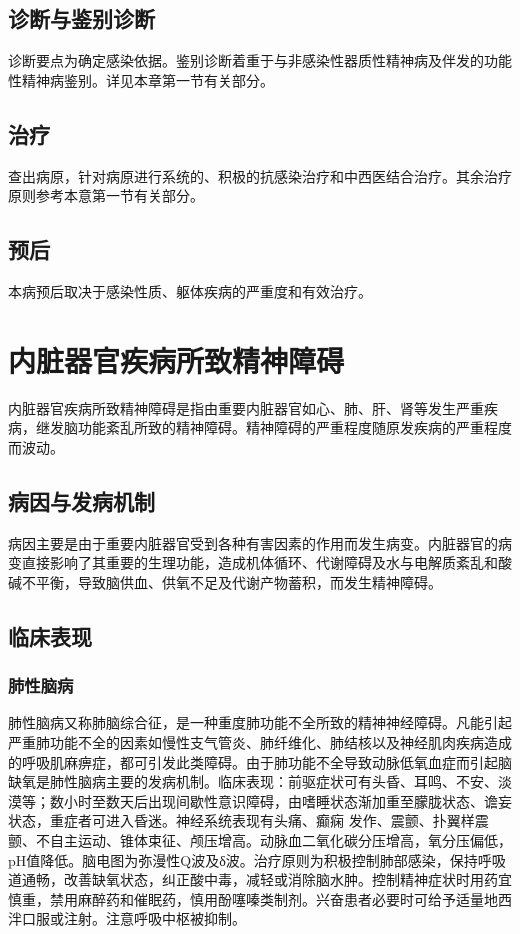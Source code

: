 \subsection{诊断与鉴别诊断}

诊断要点为确定感染依据。鉴别诊断着重于与非感染性器质性精神病及伴发的功能性精神病鉴别。详见本章第一节有关部分。

\subsection{治疗}

查出病原，针对病原进行系统的、积极的抗感染治疗和中西医结合治疗。其余治疗原则参考本意第一节有关部分。

\subsection{预后}

本病预后取决于感染性质、躯体疾病的严重度和有效治疗。

\section{内脏器官疾病所致精神障碍}

内脏器官疾病所致精神障碍是指由重要内脏器官如心、肺、肝、肾等发生严重疾病，继发脑功能紊乱所致的精神障碍。精神障碍的严重程度随原发疾病的严重程度而波动。

\subsection{病因与发病机制}

病因主要是由于重要内脏器官受到各种有害因素的作用而发生病变。内脏器官的病变直接影响了其重要的生理功能，造成机体循环、代谢障碍及水与电解质紊乱和酸碱不平衡，导致脑供血、供氧不足及代谢产物蓄积，而发生精神障碍。

\subsection{临床表现}

\subsubsection{肺性脑病}

肺性脑病又称肺脑综合征，是一种重度肺功能不全所致的精神神经障碍。凡能引起严重肺功能不全的因素如慢性支气管炎、肺纤维化、肺结核以及神经肌肉疾病造成的呼吸肌麻痹症，都可引发此类障碍。由于肺功能不全导致动脉低氧血症而引起脑缺氧是肺性脑病主要的发病机制。临床表现：前驱症状可有头昏、耳鸣、不安、淡漠等；数小时至数天后出现间歇性意识障碍，由嗜睡状态渐加重至朦胧状态、谵妄状态，重症者可进入昏迷。神经系统表现有头痛、癫痫
发作、震颤、扑翼样震颤、不自主运动、锥体束征、颅压增高。动脉血二氧化碳分压增高，氧分压偏低，pH值降低。脑电图为弥漫性Q波及δ波。治疗原则为积极控制肺部感染，保持呼吸道通畅，改善缺氧状态，纠正酸中毒，减轻或消除脑水肿。控制精神症状时用药宜慎重，禁用麻醉药和催眠药，慎用酚噻嗪类制剂。兴奋患者必要时可给予适量地西泮口服或注射。注意呼吸中枢被抑制。

